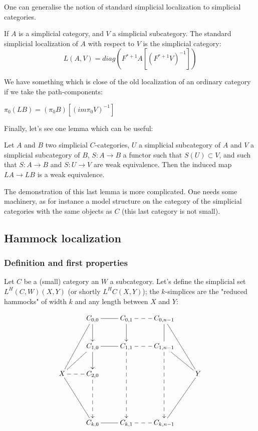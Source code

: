 \begin{refsection}
One can generalise the notion of standard simplicial localization to simplicial categories.

\begin{defin}
If $A$ is a simplicial category, and $V$ a simplicial subcategory. The standard simplicial localization of $A$ with respect to $V$ is the simplicial category:
\begin{equation}
L(A,V)=diag(F^{*+1}A[(F^{*+1}V)^{-1}])
\end{equation} 
\end{defin}

We have something which is close of the old localization of an ordinary category if we take the path-components:
\begin{prop}
$\pi_0 (LB) =(\pi_0 B)[(im \pi_0 V)^{-1}]$
\end{prop}

Finally, let's see one lemma which can be useful:

\begin{lemma}
Let $A$ and $B$ two simplicial $C$-categories, $U$ a simplicial subcategory of $A$ and $V$ a simplicial subcategory of $B$, $S: A \rightarrow B$ a functor such that $S(U) \subset V$, and such that $S: A \rightarrow B$ and $S: U \rightarrow V$ are weak equivalence. Then the induced map $LA \rightarrow LB$ is a weak equivalence.
\end{lemma}

The demonstration of this last lemma is more complicated. One needs some machinery, as for instance a model structure on the category of the simplicial categories with the same objects as $C$ (this last category is not small).


\subsection{Hammock localization}

\subsubsection{Definition and first properties}
Let $C$ be a (small) category an $W$ a subcategory. Let's define the simplicial set $L^H (C,W)(X,Y)$ (or shortly $L^H C(X,Y)$); the $k$-simplices are the "reduced hammocks" of width $k$ and any length between $X$ and $Y$:

\[
\xymatrix{& {C_{0,0}} \ar@{-}[r] \ar[d] & {C_{0,1}} \ar[d] \ar@{--}[r] & {C_{0,n-1}} \ar@{-}[d] \ar@{-}[ddr] \\
& {C_{1,0}} \ar@{-}[r] \ar[d] & {C_{1,1}} \ar@{-->}[ddd] \ar@{--}[r] & {C_{1,n-1}} \ar@{-->}[ddd] \ar@{-}[dr] \\
X \ar@{-}[uur] \ar@{-}[ur] \ar@{--}[r] \ar@{-}[ddr] & {C_{2,0}} \ar@{-->}[dd] &&& {Y} \\
                                                                             \\
& {C_{k,0}} \ar@{-}[r] & {C_{k,1}} \ar@{--}[r] & {C_{k,n-1}} \ar@{-}[uur]}
\]


\end{refsection}
